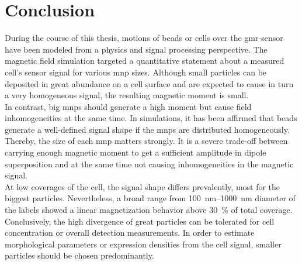 
\chapter{Conclusion}
During the course of this thesis, motions of beads or cells over the \gls{gmr}-sensor have been modeled from a physics and signal processing perspective. The magnetic field simulation targeted a quantitative statement about a measured cell's sensor signal for various \gls{mnp} sizes. Although small particles can be deposited in great abundance on a cell surface and are expected to cause in turn a very homogeneous signal, the resulting magnetic moment is small. \\
 In contrast, big \glspl{mnp} should generate a high moment but cause field inhomogeneities at the same time.  In simulations, it has been affirmed that beads generate a well-defined signal shape if the \glspl{mnp} are distributed homogeneously. Thereby, the size of each \gls{mnp} matters strongly. It is a severe trade-off between carrying enough magnetic moment to get a sufficient amplitude in dipole superposition and at the same time not causing inhomogeneities in the magnetic signal.\\
 At low coverages of the cell, the signal shape differs prevalently, most for the biggest particles. Nevertheless, a broad range from \SIrange{100}{1000}{\nano\meter} diameter of the labels showed a linear magnetization behavior above \SI{30}{\percent} of total coverage. Conclusively, the high divergence of great particles can be tolerated for cell concentration or overall detection measurements. In order to estimate morphological parameters or expression densities from the cell signal, smaller particles should be chosen predominantly.

